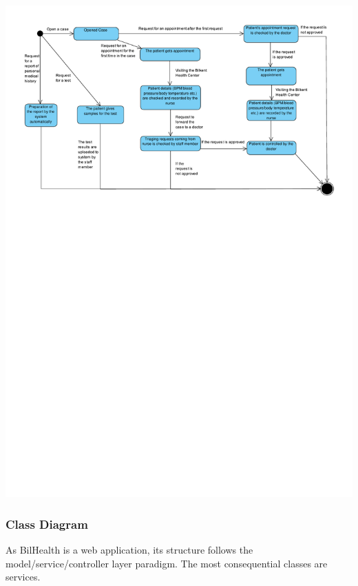 \documentclass[a4paper, 12pt, titlepage]{article}
\begin{document}
  \includegraphics[width=\linewidth]{state_diag_patient.pdf}

  \pagebreak
  \subsubsection{Class Diagram}
  
  As BilHealth is a web application, its structure follows the model/service/controller layer paradigm.
  The most consequential classes are services.
\end{document}
